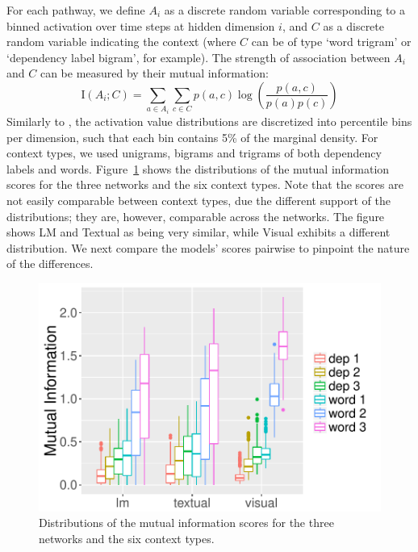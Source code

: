 For each pathway, we define $A_i$ as a discrete random variable corresponding 
to a binned activation over time steps at hidden dimension $i$, and $C$ 
as a discrete random variable indicating the context 
(where $C$ can be of type `word trigram' or `dependency label bigram', for example). 
The strength of association between $A_i$ and $C$ can be measured 
by their mutual information:
\begin{equation}
\mathrm{I}(A_i;C) = \sum_{a\in{A_i}}\sum_{c\in{C}} p(a,c)\log\left(\frac{p(a,c)}{p(a)p(c)}\right) 
\end{equation}
Similarly to , the activation value
distributions are discretized into percentile bins per dimension, such
that each bin contains 5\% of the marginal density. For context types,
we used unigrams, bigrams and trigrams of both dependency labels and
words. Figure~\ref{fig:raw_mutual} shows the distributions of the
mutual information scores for the three networks and the six context
types. Note that the scores are not easily comparable between context
types, due the different support of the distributions; they are,
however, comparable across the networks. The figure shows {\sc LM} and
{\sc Textual} as being very similar, while {\sc Visual} exhibits a
different distribution. We next compare the models' scores pairwise to
pinpoint the nature of the differences.
\begin{figure}
  \centering
  \includegraphics[scale=0.6]{raw_mutual.pdf}
  \caption{Distributions of the mutual information scores for the three networks and the six context types.}
  \label{fig:raw_mutual}
\end{figure}

